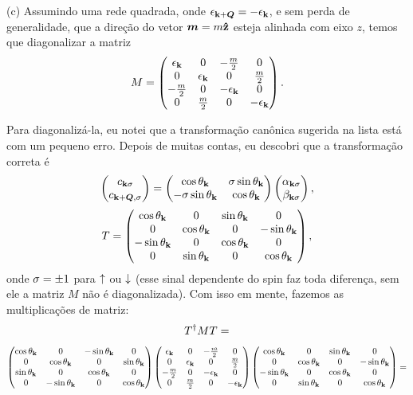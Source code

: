 \documentclass[a4paper,10pt]{article}
\begin{document}
\n

(c) Assumindo uma rede quadrada, onde $\epsilon_{\vb{k}+\bm{Q}}=-\epsilon_{\vb{k}}$, e sem perda de generalidade, que a direção do vetor $\bm{m} = m \vu{z}$ esteja alinhada com eixo $z$, temos que diagonalizar a matriz
$$
M =
\begin{pmatrix}
\epsilon_{\vb{k}} & 0 & -\frac{m}{2} & 0 \\
0 & \epsilon_{\vb{k}} & 0 & \frac{m}{2} \\
-\frac{m}{2} & 0 & -\epsilon_{\vb{k}} & 0 \\
0 & \frac{m}{2} & 0 & -\epsilon_{\vb{k}}
\end{pmatrix}.
$$

Para diagonalizá-la, eu notei que a transformação canônica sugerida na lista está com um pequeno erro. Depois de muitas contas, eu descobri que a transformação correta é
\begin{equation} \label{eq:transf}
\begin{pmatrix}
c_{\vb{k}\sigma} \\ c_{\vb{k}+\bm{Q},\sigma}
\end{pmatrix}
=
\begin{pmatrix}
\cos\theta_{\vb{k}} & \sigma\sin\theta_{\vb{k}} \\
-\sigma\sin\theta_{\vb{k}} & \cos\theta_{\vb{k}}
\end{pmatrix}
\begin{pmatrix}
\alpha_{\vb{k}\sigma} \\ \beta_{\vb{k}\sigma}
\end{pmatrix},
\end{equation}
$$
T =
\begin{pmatrix}
\cos\theta_{\vb{k}} & 0 & \sin\theta_{\vb{k}} & 0 \\
0 & \cos\theta_{\vb{k}} & 0 & -\sin\theta_{\vb{k}} \\
-\sin\theta_{\vb{k}} & 0 & \cos\theta_{\vb{k}} & 0 \\
0 & \sin\theta_{\vb{k}} & 0 & \cos\theta_{\vb{k}}
\end{pmatrix},
$$
onde $\sigma = \pm 1$ para $\uparrow$ ou $\downarrow$ (esse sinal dependente do spin faz toda diferença, sem ele a matriz $M$ não é diagonalizada). Com isso em mente, fazemos as multiplicações de matriz:
$$
T^{\dagger} M T =
$$
$$
\begin{pmatrix}
\cos\theta_{\vb{k}} & 0 & -\sin\theta_{\vb{k}} & 0 \\
0 & \cos\theta_{\vb{k}} & 0 & \sin\theta_{\vb{k}} \\
\sin\theta_{\vb{k}} & 0 & \cos\theta_{\vb{k}} & 0 \\
0 & -\sin\theta_{\vb{k}} & 0 & \cos\theta_{\vb{k}}
\end{pmatrix}
\begin{pmatrix}
\epsilon_{\vb{k}} & 0 & -\frac{m}{2} & 0 \\
0 & \epsilon_{\vb{k}} & 0 & \frac{m}{2} \\
-\frac{m}{2} & 0 & -\epsilon_{\vb{k}} & 0 \\
0 & \frac{m}{2} & 0 & -\epsilon_{\vb{k}}
\end{pmatrix}
\begin{pmatrix}
\cos\theta_{\vb{k}} & 0 & \sin\theta_{\vb{k}} & 0 \\
0 & \cos\theta_{\vb{k}} & 0 & -\sin\theta_{\vb{k}} \\
-\sin\theta_{\vb{k}} & 0 & \cos\theta_{\vb{k}} & 0 \\
0 & \sin\theta_{\vb{k}} & 0 & \cos\theta_{\vb{k}}
\end{pmatrix} =
$$
\end{document}
